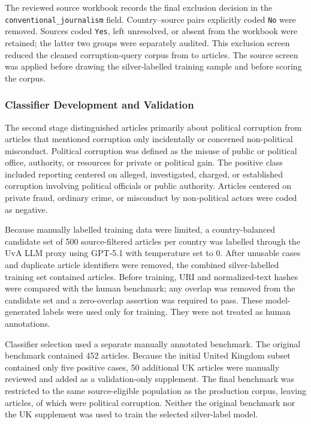 The reviewed source workbook records the final exclusion decision in the
\texttt{conventional\_journalism} field. Country--source pairs explicitly coded
\texttt{No} were removed. Sources coded \texttt{Yes}, left unresolved, or absent
from the workbook were retained; the latter two groups were separately audited.
This exclusion screen reduced the cleaned corruption-query corpus from
\PCCleanedQueryN{} to \PCSourceFilteredN{} articles. The source screen was applied before drawing
the silver-labelled training sample and before scoring the corpus.

\subsubsection{Classifier Development and Validation}

The second stage distinguished articles primarily about political corruption
from articles that mentioned corruption only incidentally or concerned
non-political misconduct. Political corruption was defined as the misuse of
public or political office, authority, or resources for private or political
gain. The positive class included reporting centered on alleged, investigated,
charged, or established corruption involving political officials or public
authority. Articles centered on private fraud, ordinary crime, or misconduct by
non-political actors were coded as negative.

Because manually labelled training data were limited, a country-balanced
candidate set of 500 source-filtered articles per country was labelled through
the UvA LLM proxy using GPT-5.1 with temperature set to 0. After unusable cases
and duplicate article identifiers were removed, the combined silver-labelled
training set contained \PCSilverTrainN{} articles. Before training, URI and
normalized-text hashes were compared with the human benchmark; any overlap was
removed from the candidate set and a zero-overlap assertion was required to
pass. These model-generated labels were used only for training. They were not
treated as human annotations.

Classifier selection used a separate manually annotated benchmark. The
original benchmark contained 452 articles. Because the initial United Kingdom
subset contained only five positive cases, 50 additional UK articles were
manually reviewed and added as a validation-only supplement. The final
benchmark was restricted to the same source-eligible population as the
production corpus, leaving \PCHumanBenchmarkN{} articles, of which
\PCHumanPositiveN{} were political corruption. Neither the original benchmark
nor the UK supplement was used to train the selected silver-label model.

